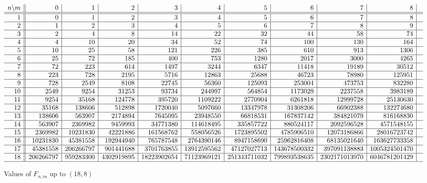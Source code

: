 \documentclass[preprint,authoryear]{elsarticle}
\begin{document}
\begin{landscape}
  \begin{figure}
    \centering
    \begin{math}
      \begin{array}[h]{r || r | r | r| r | r | r| r | r | r| r }
           n\backslash m& 0& 1 & 2 & 3 & 4 & 5 & 6 &  7 & 8 &\\
          \hline \hline
                1 &0 & 1 & 2 & 3 & 4 & 5 & 6 & 7 & 8 \\
\hline
        2 &1 & 2 & 3 & 4 & 5 & 6 & 7 & 8 & 9 \\
\hline
        3 &2 & 4 & 8 & 14 & 22 & 32 & 44 & 58 & 74 \\
\hline
        4 &4 & 10 & 20 & 34 & 52 & 74 & 100 & 130 & 164 \\
\hline
        5 &10 & 25 & 58 & 121 & 226 & 385 & 610 & 913 & 1306 \\
\hline
        6 &25 & 72 & 185 & 400 & 753 & 1280 & 2017 & 3000 & 4265 \\
\hline
        7 &72 & 223 & 614 & 1497 & 3244 & 6347 & 11418 & 19189 & 30512 \\
\hline
        8 &223 & 728 & 2195 & 5716 & 12863 & 25688 & 46723 & 78980 & 125951 \\
\hline
        9 &728 & 2549 & 8108 & 22745 & 56360 & 125093 & 253004 & 473753 & 832280 \\
\hline
        10 &2549 & 9254 & 31253 & 93734 & 244997 & 564854 & 1173029 & 2237558 & 3983189 \\
\hline
        11 & 9254 & 35168 & 124778 & 395720 & 1109222 & 2770904 & 6261818 & 12999728 & 25130630 \\
\hline
        12 & 35168 & 138606 & 512898 & 1720040 & 5097660 & 13347978 & 31308206 & 66902388 &
        132274680 \\
\hline
        13 & 138606 & 563907 & 2174894 & 7645095 & 23948550 & 66818531 &
        167837142 & 384821079 & 816168830 \\
\hline
        14 & 563907 & 2369982 & 9459993 & 34771380 & 114618495 & 335857722 &
        880524117 & 2092596528 & 4571548155 \\
\hline
        15 & 2369982 & 10231830 & 42221886 & 161568762 & 558056526 & 1723895502 &
        4785906510 & 12073186866 & 28016723742 \\
        \hline
        16 & 10231830 & 45381558 & 192944940 & 765787548 & 2764390146 &
        8947158690 & 25962816408 & 68135021640 & 163627733358 \\
        \hline
17 & 45381558 & 206266797 & 901441688 & 3701763855 & 13912595562 &
 47127027713 & 143678500332 & 397091138883 & 1005324501470\\
\hline
18 & 206266797& 959283300& 4302919895& 18223902654& 71123969121&
 251343711032& 799893538635& 2302171013970& 6046781201429\\
\hline
     \end{array}
    \end{math}
\caption{Values of $F_{n,m}$ up to $(18,8)$}
    \label{fig:F}
  \end{figure}
\end{landscape}
\end{document}
